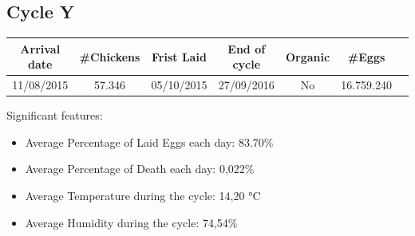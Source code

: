 \documentclass[11pt]{article}
\begin{document}
\subsection{Cycle Y}
\begin{center}
    \begin{tabular}{| c | c | c | c | c | c | c |} 
        \hline
        Arrival date & \#Chickens & Frist Laid & End of cycle & Organic & \#Eggs\\ [0.5ex] 
        \hline
        11/08/2015 & 57.346 & 05/10/2015 & 27/09/2016 & No & 16.759.240\\ 
        \hline
    \end{tabular}
\end{center}

Significant features:
\begin{itemize}
    \item Average Percentage of Laid Eggs each day: 83.70\%
    \item Average Percentage of Death each day: 0,022\%
    \item Average Temperature during the cycle: 14,20 °C
    \item Average Humidity during the cycle: 74,54\%
\end{itemize}
\end{document}
